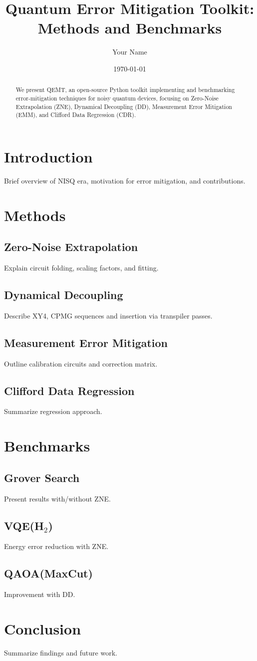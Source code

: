 \documentclass[12pt]{article}
\title{Quantum Error Mitigation Toolkit: Methods and Benchmarks}
\author{Your Name}
\date{\today}
\begin{document}
\maketitle

\begin{abstract}
We present QEMT, an open-source Python toolkit implementing and benchmarking error-mitigation techniques for noisy quantum devices, focusing on Zero-Noise Extrapolation (ZNE), Dynamical Decoupling (DD), Measurement Error Mitigation (EMM), and Clifford Data Regression (CDR).
\end{abstract}

\section{Introduction}
Brief overview of NISQ era, motivation for error mitigation, and contributions.

\section{Methods}
\subsection{Zero-Noise Extrapolation}
Explain circuit folding, scaling factors, and fitting.

\subsection{Dynamical Decoupling}
Describe XY4, CPMG sequences and insertion via transpiler passes.

\subsection{Measurement Error Mitigation}
Outline calibration circuits and correction matrix.

\subsection{Clifford Data Regression}
Summarize regression approach.

\section{Benchmarks}
\subsection{Grover Search}
Present results with/without ZNE.

\subsection{VQE(H$_2$)}
Energy error reduction with ZNE.

\subsection{QAOA(MaxCut)}
Improvement with DD.

\section{Conclusion}
Summarize findings and future work.



\end{document}
